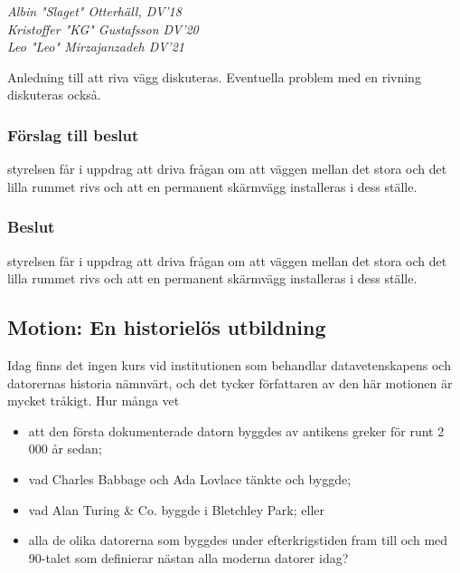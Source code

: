 \documentclass[protokoll]{dvd}
\begin{document}
\emph{Albin "Slaget" Otterhäll, DV'18} \\
\emph{Kristoffer "KG" Gustafsson DV'20} \\
\emph{Leo "Leo" Mirzajanzadeh DV'21}

Anledning till att riva vägg diskuteras. Eventuella problem med en rivning diskuteras också.


    \subsubsection*{Förslag till beslut}
        \begin{attsatser}
            \item styrelsen får i uppdrag att driva frågan om att väggen mellan det stora och det lilla rummet rivs och att en permanent skärmvägg installeras i dess ställe.
        \end{attsatser}

    \subsubsection*{Beslut}
        \begin{attsatser}
            \item styrelsen får i uppdrag att driva frågan om att väggen mellan det stora och det lilla rummet rivs och att en permanent skärmvägg installeras i dess ställe.
        \end{attsatser}

\subsection{Motion: En historielös utbildning}

Idag finns det ingen kurs vid institutionen som behandlar datavetenskapens och datorernas historia nämnvärt, och det tycker författaren av den här motionen är mycket tråkigt.
Hur många vet
    \begin{itemize}
        \item att den första dokumenterade datorn byggdes av antikens greker för runt 2 000 år sedan;
        \item vad Charles Babbage och Ada Lovlace tänkte och byggde;
        \item vad Alan Turing \& Co. byggde i Bletchley Park; eller
        \item alla de olika datorerna som byggdes under efterkrigstiden fram till och med 90-talet som definierar nästan alla moderna datorer idag?
    \end{itemize}
\end{document}
